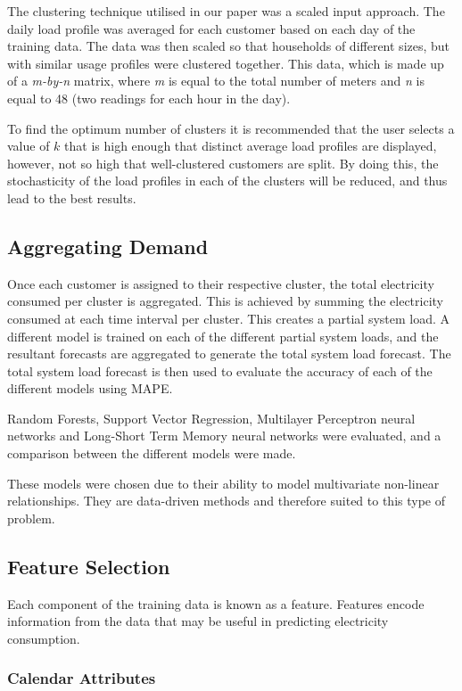 The clustering technique utilised in our paper was a scaled input approach. The daily load profile was averaged for each customer based on each day of the training data. The data was then scaled so that households of different sizes, but with similar usage profiles were clustered together. This data, which is made up of a \textit{m-by-n} matrix, where \textit{m} is equal to the total number of meters and \textit{n} is equal to 48 (two readings for each hour in the day).

To find the optimum number of clusters it is recommended that the user selects a value of $k$ that is high enough that distinct average load profiles are displayed, however, not so high that well-clustered customers are split. By doing this, the stochasticity of the load profiles in each of the clusters will be reduced, and thus lead to the best results.


\subsection{Aggregating Demand}

Once each customer is assigned to their respective cluster, the total electricity consumed per cluster is aggregated. This is achieved by summing the electricity consumed at each time interval per cluster. This creates a partial system load. A different model is trained on each of the different partial system loads, and the resultant forecasts are aggregated to generate the total system load forecast. The total system load forecast is then used to evaluate the accuracy of each of the different models using MAPE. 

Random Forests, Support Vector Regression, Multilayer Perceptron neural networks and Long-Short Term Memory neural networks were evaluated, and a comparison between the different models were made. 

These models were chosen due to their ability to model multivariate non-linear relationships. They are data-driven methods and therefore suited to this type of problem.

\subsection{Feature Selection}

Each component of the training data is known as a feature. Features encode information from the data that may be useful in predicting electricity consumption. 

\subsubsection{Calendar Attributes}


